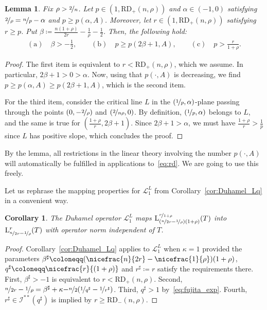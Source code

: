\documentclass[11pt, leqno]{amsart}
\newtheorem{lemma}[theorem]{Lemma}
\newtheorem{corollary}[theorem]{Corollary}
\theoremstyle{definition}
\renewcommand{\L}{\mathrm{L}}
\newcommand{\Soll}{\mathcal{L}}
\newcommand{\RD}{\mathrm{RD}}
\newcommand{\SobSet}{\mathcal{I}}
\begin{document}
	\begin{lemma}
		\label{lem:p_A_rd}
		Fix $\rho > \nicefrac{2}{n}$. Let $p \in (1,\RD_{+}(n,\rho))$ and $\alpha \in (-1,0)$ satisfying $\nicefrac{2}{\rho} = \nicefrac{n}{p} - \alpha$ and $p \geq p(\alpha, A)$. Moreover, let $r \in (1,\RD_{+}(n,\rho))$ satisfying $r \geq p$. Put $\beta \coloneqq \tfrac{n(1+\rho)}{2r} - \tfrac{1}{\rho} - \tfrac{1}{2}$. Then, the following hold:
		\begin{align}
			\mathrm{(a)} \quad \beta > -\tfrac{1}{2}, \qquad \mathrm{(b)} \quad p \geq p(2\beta + 1, A), \qquad \mathrm{(c)} \quad p > \tfrac{r}{1+\rho}.
		\end{align}
	\end{lemma}

	\begin{proof}
		The first item is equivalent to $r < \RD_{+}(n,\rho)$, which we assume. In particular, $2\beta + 1 > 0 > \alpha$. Now, using that $p(\cdot,A)$ is decreasing, we find $p \geq p(\alpha, A) \geq p(2\beta + 1, A)$, which is the second item.

		For the third item, consider the critical line $L$ in the $(\nicefrac{1}{p},\alpha)$-plane passing through the points $(0, -\nicefrac{2}{\rho})$ and $(\nicefrac{2}{n\rho}, 0)$. By definition, $(\nicefrac{1}{p}, \alpha)$ belongs to $L$, and the same is true for $(\tfrac{1+\rho}{r}, 2\beta + 1)$. Since $2\beta + 1 > \alpha$, we must have $\tfrac{1+\rho}{r} > \tfrac{1}{p}$ since $L$ has positive slope, which concludes the proof.
	\end{proof}



	By the lemma, all restrictions in the linear theory involving the number $p(\cdot, A)$ will automatically be fulfilled in applications to~\eqref{eq:rd}. We are going to use this freely.

	Let us rephrase the mapping properties for $\Soll^L_1$ from Corollary~\ref{cor:Duhamel_Lq} in a convenient way.
	\begin{corollary}
		\label{cor:Duhamel_RD}
		The Duhamel operator $\Soll^L_1$ maps $\L^{\nicefrac{r}{1+\rho}}_{(\nicefrac{n}{2r} - \nicefrac{1}{\rho})(1 + \rho)}(T)$ into $\L^r_{\nicefrac{n}{2r} - \nicefrac{1}{\rho}}(T)$ with operator norm independent of $T$.
	\end{corollary}

	\begin{proof}
		Corollary~\ref{cor:Duhamel_Lq} applies to $\Soll^L_1$ when $\kappa=1$ provided
		the parameters $\beta^\sharp \coloneqq (\nicefrac{n}{2r} - \nicefrac{1}{\rho})(1 + \rho)$, $q^\sharp \coloneqq \nicefrac{r}{(1+\rho)}$ and $r^\sharp \coloneqq r$ satisfy the requirements there. %
		First, $\beta^\sharp > -1$ is equivalent to $r <\RD_{+}(n,\rho)$.
		Second, $\nicefrac{n}{2r} - \nicefrac{1}{\rho} =\beta^\sharp+\kappa {-\nicefrac{n}{2}(\nicefrac{1}{q^\sharp} - \nicefrac{1}{r^\sharp})}$.
		Third, $q^\sharp > 1$ by~\eqref{eq:fujita_exp}.
		Fourth, $r^\sharp \in \SobSet^{**}(q^\sharp)$ is implied by $r \geq \RD_{-}(n,\rho)$.
	\end{proof}
\end{document}
